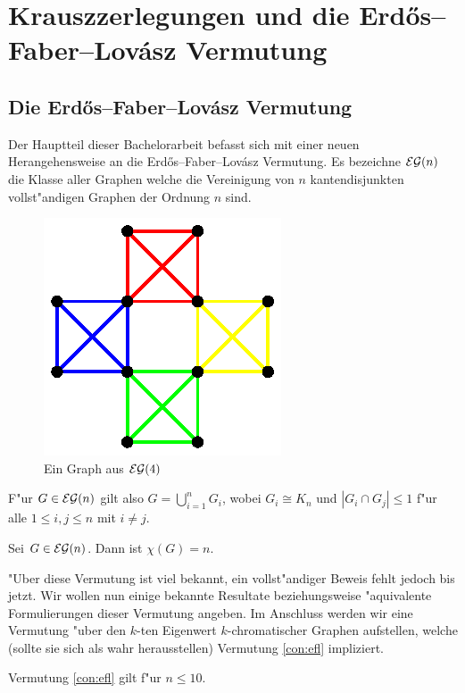 \section{Krauszzerlegungen und die Erd\H{o}s--Faber--Lov\'asz Vermutung}
\subsection{Die Erd\H{o}s--Faber--Lov\'asz Vermutung}
\label{sec:EFL-Vermutung}
Der Hauptteil dieser Bachelorarbeit befasst sich mit einer neuen Herangehensweise an die Erd\H{o}s--Faber--Lov\'asz Vermutung. 
Es bezeichne ${\cal EG}(n)$ die Klasse aller Graphen welche die Vereinigung von $n$ kantendisjunkten vollst"andigen Graphen der Ordnung $n$ sind. 

\begin{figure}[htbp]
        \centering
        \includegraphics{images/bildeg4}
        \caption{Ein Graph aus ${\cal EG}(4)$}
\end{figure}

F"ur $G\in{\cal EG}(n)$ gilt also $G= \bigcup\limits_{i=1}^{n} G_i$, wobei $G_i \cong K_n$ und $|G_i \cap G_j| \leq 1$ f"ur alle $1\leq i,j \leq n$ mit $i\neq j$. 
\begin{conjecture}
  Sei $G\in{\cal EG}(n)$. Dann ist $\chi(G) = n$.
  \label{con:efl}
\end{conjecture}
"Uber diese Vermutung ist viel bekannt, ein vollst"andiger Beweis fehlt jedoch bis jetzt. Wir wollen nun einige bekannte Resultate beziehungsweise "aquivalente Formulierungen dieser Vermutung angeben. Im Anschluss werden wir eine Vermutung "uber den $k$-ten Eigenwert $k$-chromatischer Graphen aufstellen, welche (sollte sie sich als wahr herausstellen) Vermutung \ref{con:efl} impliziert.
\begin{remark}
  Vermutung \ref{con:efl} gilt f"ur $n\leq 10$.
\end{remark}
